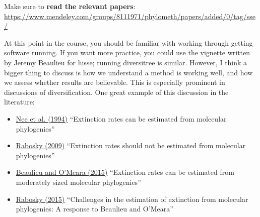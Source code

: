 \documentclass[]{book}
\providecommand{\tightlist}{%
  \setlength{\itemsep}{0pt}\setlength{\parskip}{0pt}}
\theoremstyle{definition}
\theoremstyle{definition}
\theoremstyle{remark}
\begin{document}
Make sure to \textbf{read the relevant papers}:
\url{https://www.mendeley.com/groups/8111971/phylometh/papers/added/0/tag/sse/}

At this point in the course, you should be familiar with working through
getting software running. If you want more practice, you could use the
\href{https://cran.r-project.org/web/packages/hisse/vignettes/hisse-vignette.html}{vignette}
written by Jeremy Beaulieu for hisse; running diversitree is similar.
However, I think a bigger thing to discuss is how we understand a method
is working well, and how we assess whether results are believable. This
is especially prominent in discussions of diversification. One great
example of this discussion in the literature:

\begin{itemize}
\tightlist
\item
  \href{http://rstb.royalsocietypublishing.org/content/344/1307/77}{Nee
  et al. (1994)} ``Extinction rates can be estimated from molecular
  phylogenies''
\item
  \href{http://onlinelibrary.wiley.com/doi/10.1111/j.1558-5646.2009.00926.x/abstract}{Rabosky
  (2009)} ``Extinction rates should not be estimated from molecular
  phylogenies''
\item
  \href{http://onlinelibrary.wiley.com/doi/10.1111/evo.12614/abstract}{Beaulieu
  and O'Meara (2015)} ``Extinction rates can be estimated from
  moderately sized molecular phylogenies''
\item
  \href{http://onlinelibrary.wiley.com/doi/10.1111/evo.12820/full}{Rabosky
  (2015)} ``Challenges in the estimation of extinction from molecular
  phylogenies: A response to Beaulieu and O'Meara''
\end{itemize}
\end{document}
